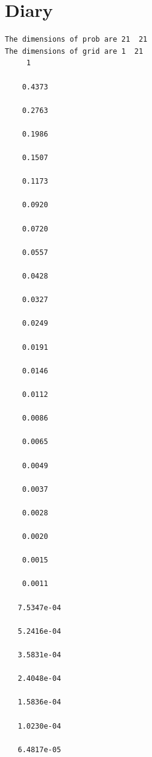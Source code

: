 \documentclass[12pt]{article}
\begin{document}
\section*{Diary}
\begin{verbatim}
The dimensions of prob are 21  21
The dimensions of grid are 1  21
     1

    0.4373

    0.2763

    0.1986

    0.1507

    0.1173

    0.0920

    0.0720

    0.0557

    0.0428

    0.0327

    0.0249

    0.0191

    0.0146

    0.0112

    0.0086

    0.0065

    0.0049

    0.0037

    0.0028

    0.0020

    0.0015

    0.0011

   7.5347e-04

   5.2416e-04

   3.5831e-04

   2.4048e-04

   1.5836e-04

   1.0230e-04

   6.4817e-05
\end{verbatim}
\end{document}

